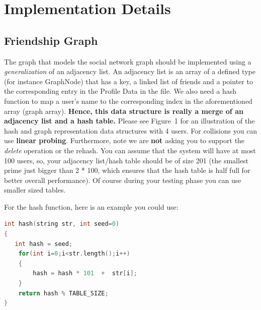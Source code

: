 \documentclass[times, 12pt]{article}
\begin{document}
\section{Implementation Details}
\subsection{Friendship Graph}
The graph that models the social network graph should be implemented using a {\em generalization} of an adjacency list. An adjacency list is an array of a defined type (for instance GraphNode) that has a key, a linked list of friends and a pointer to the corresponding entry in the Profile Data in the file.
We also need a hash function to map a user's name to the corresponding index in the aforementioned array (graph array). %
{\bf Hence, this data structure is really a merge of an adjacency list and a hash table.} Please see Figure~1 for an illustration of the hash and graph representation data structures with 4 users.  For collisions you can use {\bf linear probing}.  Furthermore, note we are {\bf not} asking you to support the {\em delete} operation or the rehash.  You can assume that the system will have at most 100 users, so, your adjacency list/hash table should be of size 201 (the smallest prime just bigger than 2 * 100, which ensures that the hash table is half full for better overall performance).  Of course during your testing phase you can use smaller sized tables.

%

\noindent For the hash function, here is an example you could use:

\begin{lstlisting}[language=C++,
    directivestyle={\color{black}}
    emph={int,char,double,float,unsigned},
    emphstyle={\color{green}}
   ]
int hash(string str, int seed=0)
{
   int hash = seed;
    for(int i=0;i<str.length();i++)
    {
        hash = hash * 101  +  str[i];
    }
    return hash % TABLE_SIZE;
}
\end{lstlisting}
\end{document}
